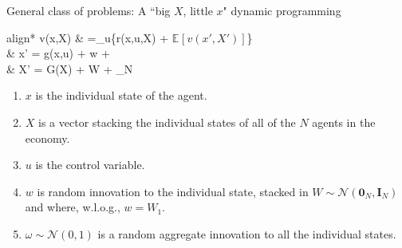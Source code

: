 \documentclass[aspectratio=169,10pt]{beamer}
\newcommand{\expec}[2][]{\ensuremath{\mathbb{E}_{{#1}}\left[ {#2} \right]}}
\begin{document}
	
	\begin{frame}{General class of problems: A ``big $X$, little $x$" dynamic programming}
		\begin{empheq}[box=\tcbhighmath]{align*}
			v(x,X)       & =\max_{u}\left\{r\big(x,u,X\big) + \beta \expec{v(x',X')}\right\} \\
			 & x' = g(x,u) + \sigma w + \eta \omega                              \\
			& X' = G(X) + \Omega W + \eta \omega {}_N
		\end{empheq}
	\begin{enumerate}
		\item $x$ is the individual state of the agent.
		\vspace{0.1in}
		\item $X$ is a vector stacking the individual states of all of the $N$ agents in the economy.
		\vspace{0.1in}
		\item $u$ is the control variable.
		\vspace{0.1in}
		\item $w$ is random innovation to the individual state, stacked in $W \sim \mathcal{N}(\mathbf{0}_N,\mathbf{I}_N)$ and where, w.l.o.g., $w = W_1$.
		\vspace{0.1in}
		\item $\omega \sim \mathcal{N}(0,1)$ is a random aggregate innovation to all the individual states.
		
	\end{enumerate}
	
	\end{frame}
\end{document}
